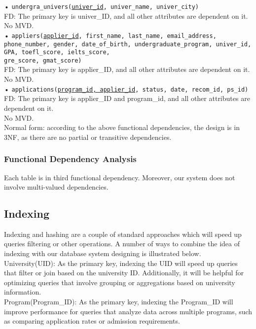 \documentclass[12pt, a4paper]{article}
\begin{document}
\begin{spacing}{1.32}
\noindent
• \texttt{undergra\_univers(\underline{univer\_id}, univer\_name, univer\_city)}\\
FD: The primary key is univer\_ID, and all other attributes are dependent on it.\\
No MVD.\\

\noindent
• \texttt{appliers(\underline{applier\_id}, first\_name, last\_name, email\_address, phone\_number, gender, date\_of\_birth, undergraduate\_program, univer\_id, GPA, toefl\_score, ielts\_score, \\gre\_score, gmat\_score)}\\
FD: The primary key is applier\_ID, and all other attributes are dependent on it.\\
No MVD.\\

\noindent
• \texttt{applications(\underline{program\_id, applier\_id}, status, date, recom\_id, ps\_id)}
FD: The primary key is applier\_ID and program\_id, and all other attributes are dependent on it.\\
No MVD.\\

\noindent
Normal form: according to the above functional dependencies, the design is in 3NF, as there are no partial or transitive dependencies.
\subsubsection{Functional Dependency Analysis}

Each table is in third functional dependency. Moreover, our system does not involve multi-valued dependencies. 


\subsection{Indexing}
Indexing and hashing are a couple of standard approaches which will speed up queries filtering or other operations. A number of ways to combine the idea of indexing with our database system designing is illustrated below.\\

University(UID): As the primary key, indexing the UID will speed up queries that filter or join based on the university ID. Additionally, it will be helpful for optimizing queries that involve grouping or aggregations based on university information.\\

Program(Program\_ID): As the primary key, indexing the Program\_ID will improve performance for queries that analyze data across multiple programs, such as comparing application rates or admission requirements.\\


\end{spacing}
\end{document}

